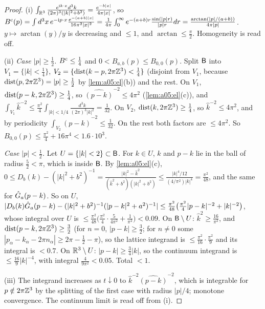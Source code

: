 \begin{proof}
(i) $\int_{\mathbb R^3}\frac{e^{\mathrm ik\cdot x}d^3k}{(2\pi)^3(|k|^2+b^2)}=\frac{e^{-b|x|}}{4\pi|x|}$, so $B^{\mathrm c}(p)=\int d^3x\,e^{-\mathrm ip\cdot x}\frac{e^{-(a+b)|x|}}{16\pi^2|x|^2}=\frac1{4\pi}\int_0^\infty e^{-(a+b)r}\frac{\sin(|p|r)}{|p|r}dr=\frac{\arctan(|p|/(a+b))}{4\pi|p|}$. $y\mapsto\arctan(y)/y$ is decreasing and $\le1$, and $\arctan\le\frac\pi2$. Homogeneity is read off.

(ii) \emph{Case $|p|\ge\frac12$.} $B^{\mathrm c}\le\frac14$ and $0<B_{a,b}(p)\le B_{0,0}(p)$. Split $\mathsf B$ into $V_1=\{|k|<\frac14\}$, $V_2=\{\operatorname{dist}(k-p,2\pi\mathbb Z^3)<\frac14\}$ (disjoint from $V_1$, because $\operatorname{dist}(p,2\pi\mathbb Z^3)=|p|\ge\frac12$ by \cref{lem:a05:el}(b)) and the rest. On $V_1$, $\operatorname{dist}(p-k,2\pi\mathbb Z^3)\ge\frac14$, so $\widehat{(p-k)}^{-2}\le4\pi^2$ (\cref{lem:a05:el}(c)), and $\int_{V_1}\hat k^{-2}\le\frac{\pi^2}4\int_{|k|<1/4}\frac{d^3k}{(2\pi)^3|k|^2}=\frac1{32}$. On $V_2$, $\operatorname{dist}(k,2\pi\mathbb Z^3)\ge\frac14$, so $\hat k^{-2}\le4\pi^2$, and by periodicity $\int_{V_2}\widehat{(p-k)}^{-2}\le\frac1{32}$. On the rest both factors are $\le4\pi^2$. So $B_{0,0}(p)\le\frac{\pi^2}4+16\pi^4<1.6\cdot10^3$.

\emph{Case $|p|<\frac12$.} Let $U=\{|k|<2\}\subset\mathsf B$. For $k\in U$, $k$ and $p-k$ lie in the ball of radius $\frac52<\pi$, which is inside $\mathsf B$. By \cref{lem:a05:el}(c), $0\le D_b(k)-(|k|^2+b^2)^{-1}=\frac{|k|^2-\hat k^2}{(\hat k^2+b^2)(|k|^2+b^2)}\le\frac{|k|^4/12}{(4/\pi^2)|k|^4}=\frac{\pi^2}{48}$, and the same for $\hat G_a(p-k)$. So on $U$, $|D_b(k)\hat G_a(p-k)-(|k|^2+b^2)^{-1}(|p-k|^2+a^2)^{-1}|\le\frac{\pi^2}{48}\big(\frac{\pi^2}4|p-k|^{-2}+|k|^{-2}\big)$, whose integral over $U$ is $\le\frac{\pi^2}{48}\big(\frac{\pi^2}4\cdot\frac5{4\pi^2}+\frac1{\pi^2}\big)<0.09$. On $\mathsf B\setminus U$: $\hat k^2\ge\frac{16}{\pi^2}$, and $\operatorname{dist}(p-k,2\pi\mathbb Z^3)\ge\frac32$ (for $n=0$, $|p-k|\ge\frac32$; for $n\ne0$ some $|p_\alpha-k_\alpha-2\pi n_\alpha|\ge2\pi-\frac12-\pi$), so the lattice integrand is $\le\frac{\pi^2}{16}\cdot\frac{\pi^2}9$ and its integral is $<0.7$. On $\mathbb R^3\setminus U$: $|p-k|\ge\frac34|k|$, so the continuum integrand is $\le\frac{16}9|k|^{-4}$, with integral $\frac4{9\pi^2}<0.05$. Total $<1$.

(iii) The integrand increases as $t\downarrow0$ to $\hat k^{-2}\widehat{(p-k)}^{-2}$, which is integrable for $p\notin2\pi\mathbb Z^3$ by the splitting of the first case with radius $|p|/4$; monotone convergence. The continuum limit is read off from (i).
\end{proof}

